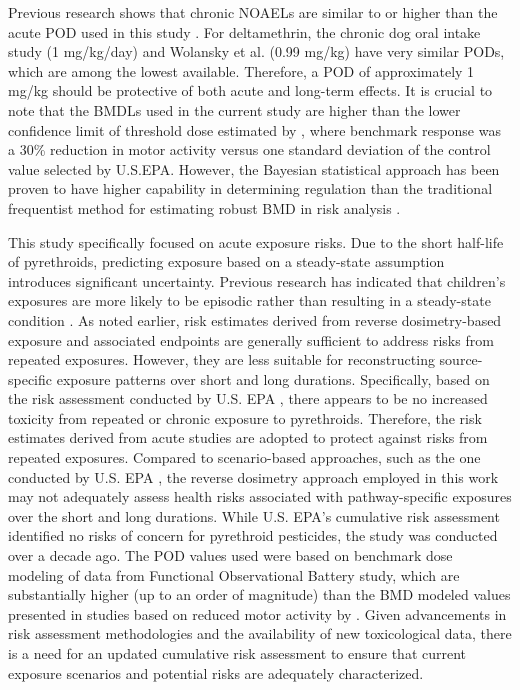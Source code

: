 \documentclass[toxics,article,submit,pdftex,moreauthors]{Definitions/mdpi}
\begin{document}
Previous research shows that chronic NOAELs are similar to or higher than the
acute POD used in this study \citep{us2017deltamethrin}. For deltamethrin, the
chronic dog oral intake study (1 mg/kg/day) and Wolansky et al.
\citep{wolansky_relative_2006} (0.99 mg/kg) have very similar PODs, which are
among the lowest available. Therefore, a POD of approximately 1 mg/kg should be
protective of both acute and long-term effects. It is crucial to note that the
BMDLs used in the current study are higher than the lower confidence limit of
threshold dose estimated by \citep{wolansky_relative_2006}, where benchmark
response was a 30\% reduction in motor activity versus one standard deviation
of the control value selected by U.S.EPA. However, the Bayesian statistical
approach has been proven to have higher capability in determining regulation
than the traditional frequentist method for estimating robust BMD in risk
analysis \citep{desai_role_2024}.

This study specifically focused on acute exposure risks. Due to the short
half-life of pyrethroids, predicting exposure based on a steady-state
assumption introduces significant uncertainty. Previous research has indicated
that children's exposures are more likely to be episodic rather than resulting
in a steady-state condition \citep{kissel_comparison_2005}. As noted earlier,
risk estimates derived from reverse dosimetry-based exposure and associated
endpoints are generally sufficient to address risks from repeated exposures.
However, they are less suitable for reconstructing source-specific exposure
patterns over short and long durations. Specifically, based on the risk
assessment conducted by U.S. EPA \citep{us2017cyfluthrin, us2017deltamethrin,
us2017permethrin, us2011pyrethroid, us2018cypermethrin}, there appears to be no
increased toxicity from repeated or chronic exposure to pyrethroids. Therefore,
the risk estimates derived from acute studies are adopted to protect against
risks from repeated exposures. Compared to scenario-based approaches, such as
the one conducted by U.S. EPA \citep{us2011pyrethroid}, the reverse dosimetry
approach employed in this work may not adequately assess health risks
associated with pathway-specific exposures over the short and long durations. While 
U.S. EPA's cumulative risk assessment identified no risks of concern for
pyrethroid pesticides, the study was conducted over a decade ago. The POD
values used were based on benchmark dose modeling of data from Functional
Observational Battery study, which are substantially higher (up to an order of
magnitude) than the BMD modeled values presented in studies based on reduced
motor activity by \citet{wolansky_relative_2006,
wolansky_marcelo_j_evidence_2009}. Given advancements in risk assessment
methodologies and the availability of new toxicological data, there is a need
for an updated cumulative risk assessment to ensure that current exposure
scenarios and potential risks are adequately characterized.
\end{document}
